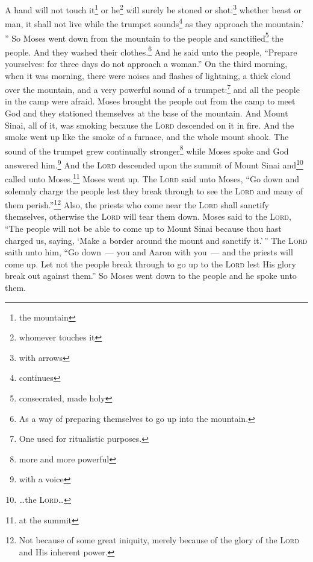 \begin{enumerate}[align=center]
     A hand will not touch it\footnote{the mountain} or he\footnote{whomever touches it} will surely be stoned or shot:\footnote{with arrows} whether beast or man, it shall not live while the trumpet sounds\footnote{continues} as they approach the mountain.' ''%
     So Moses went down from the mountain to the people and sanctified\footnote{consecrated, made holy} the people. And they washed their clothes.\footnote{As a way of preparing themselves to go up into the mountain.}%
     And he said unto the people, ``Prepare yourselves: for three days do not approach a woman.''%
     On the third morning, when it was morning, there were noises and flashes of lightning, a thick cloud over the mountain, and a very powerful sound of a trumpet:\footnote{One used for ritualistic purposes.} and all the people in the camp were afraid.%
     Moses brought the people out from the camp to meet God and they stationed themselves at the base of the mountain.%
     And Mount Sinai, all of it, was smoking because the \textsc{Lord} descended on it in fire. And the smoke went up like the smoke of a furnace, and the whole mount shook.%
     The sound of the trumpet grew continually stronger\footnote{more and more powerful} while Moses spoke and God answered him.\footnote{with a voice}%
     And the \textsc{Lord} descended upon the summit of Mount Sinai and\footnote{\dots the \textsc{Lord}\dots} called unto Moses.\footnote{at the summit} Moses went up.%
     The \textsc{Lord} said unto Moses, ``Go down and solemnly charge the people lest they break through to see the \textsc{Lord} and many of them perish.''\footnote{Not because of some great iniquity, merely because of the glory of the \textsc{Lord} and His inherent power.}%
     Also, the priests who come near the \textsc{Lord} shall sanctify themselves, otherwise the \textsc{Lord} will tear them down.%
     Moses said to the \textsc{Lord}, ``The people will not be able to come up to Mount Sinai because thou hast charged us, saying, `Make a border around the mount and sanctify it.'$\,$''%
     The \textsc{Lord} saith unto him, ``Go down~--- you and Aaron with you~--- and the priests will come up. Let not the people break through to go up to the \textsc{Lord} lest His glory break out against them.''%
     So Moses went down to the people and he spoke unto them.%
\end{enumerate}
